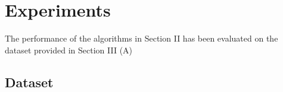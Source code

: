 %



\section{Experiments}

The performance of the algorithms in Section II has been evaluated on the dataset provided in Section III (A)

\subsection{Dataset}

